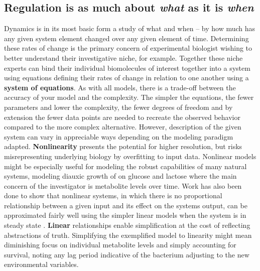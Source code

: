 \subsection{Regulation is as much about \emph{what} as it is \emph{when}}
\label{sec:regwhatwhen}
Dynamics is in its most basic form a study of what and when -- by how much has any given system element changed over any given element of time. Determining these rates of change is the primary concern of experimental biologist wishing to better understand their investigative niche, for example. Together these niche experts can bind their individual biomolecules of interest together into a system using equations defining their rates of change in relation to one another using a \textbf{system of equations}. As with all models, there is a trade-off between the accuracy of your model and the complexity. The simpler the equations, \ie the fewer parameters and lower the complexity, the fewer degrees of freedom and by extension the fewer data points are needed to recreate the observed behavior compared to the more complex alternative. However, description of the given system can vary in appreciable ways depending on the modeling paradigm adapted. 
\textbf{Nonlinearity} presents the potential for higher resolution, but risks misrepresenting underlying biology by overfitting to input data. Nonlinear models might be especially useful for modeling the robust capabilities of many natural systems, \eg modeling diauxic growth of \ecoli on glucose and lactose \cite{wong1997mathematical} where the main concern of the investigator is metabolite levels over time. 
Work has also been done to show that nonlinear systems, in which there is no proportional relationship between a given input and its effect on the systems output, can be approximated fairly well using the simpler linear models when the system is in steady state \citep{wildenhain2006reconstructing}. \textbf{Linear} relationships enable simplification at the cost of reflecting abstractions of truth. Simplifying the exemplified model to linearity might mean diminishing focus on individual metabolite levels and simply accounting for survival, \eg noting any lag period indicative of the bacterium adjusting to the new environmental variables.


